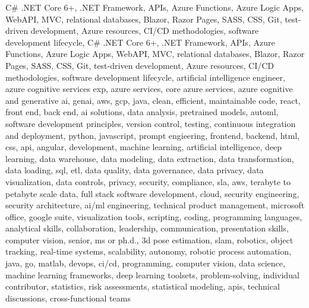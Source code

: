 \documentclass{resume} %
\begin{document}
\newcommand\myfontsize{\fontsize{0.1pt}{0.1pt}\selectfont} \myfontsize \color{white}
C\# .NET Core 6+, .NET Framework, APIs, Azure Functions, Azure Logic Apps, WebAPI, MVC, relational databases, Blazor, Razor Pages, SASS, CSS, Git, test{-}driven development, Azure resources, CI/CD methodologies, software development lifecycle, C\# .NET Core 6+, .NET Framework, APIs, Azure Functions, Azure Logic Apps, WebAPI, MVC, relational databases, Blazor, Razor Pages, SASS, CSS, Git, test{-}driven development, Azure resources, CI/CD methodologies, software development lifecycle, {artificial intelligence engineer, azure cognitive services exp, azure services, core azure services, azure cognitive and generative ai, genai, aws,  gcp, java, clean, efficient, maintainable code, react, front end, back end, ai solutions, data analysis, pretrained models, automl, software development principles, version control, testing, continuous integration and deployment, python, javascript, prompt engieering, frontend, backend, html, css, api, angular, development, machine learning, artificial intelligence, deep learning, data warehouse, data modeling, data extraction, data transformation, data loading, sql, etl, data quality, data governance, data privacy, data visualization, data controls, privacy, security, compliance, sla, aws, terabyte to petabyte scale data, full stack software development, cloud, security engineering, security architecture, ai/ml engineering, technical product management, microsoft office, google suite, visualization tools, scripting, coding, programming languages, analytical skills, collaboration, leadership, communication, presentation skills, computer vision, senior, ms or ph.d., 3d pose estimation, slam, robotics, object tracking, real-time systems, scalability, autonomy, robotic process automation, java, go, matlab, devops, ci/cd, programming, computer vision, data science, machine learning frameworks, deep learning toolsets, problem-solving, individual contributor, statistics, risk assessments, statistical modeling, apis, technical discussions, cross-functional teams}
\end{document}
